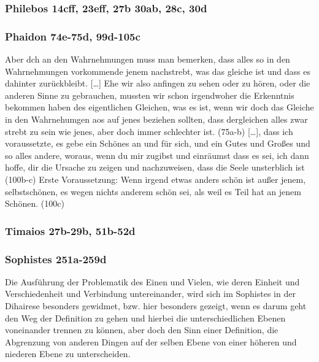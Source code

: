 \documentclass[12pt]{article}
\begin{document}
\subsubsection{Philebos 14cff, 23eff, 27b 30ab, 28c, 30d}

\subsubsection{Phaidon 74e-75d, 99d-105c}
Aber dch an den Wahrnehmungen muss man bemerken, dass alles so in den Wahrnehmungen vorkommende jenem nachstrebt, was das gleiche ist und dass es dahinter zurückbleibt. [\dots] Ehe wir also anfingen zu sehen oder zu hören, oder die anderen Sinne zu gebrauchen, mussten wir schon irgendwoher die Erkenntnis bekommen haben des eigentlichen Gleichen, was es ist, wenn wir doch das Gleiche in den Wahrnehumgen aos auf jenes beziehen sollten, dass dergleichen alles zwar strebt zu sein wie jenes, aber doch immer schlechter ist. (75a-b) 
[\dots], dass ich voraussetzte, es gebe ein Schönes an und für sich, und ein Gutes und Großes und so alles andere, woraus, wenn du mir zugibst und einräumst dass es sei, ich dann hoffe, dir die Ursache zu zeigen und nachzuweisen, dass die Seele unsterblich ist (100b-c)
Erste Voraussetzung: Wenn irgend etwas anders schön ist außer jenem, selbstschönen, es wegen nichts anderem schön sei, als weil es Teil hat an jenem Schönen. (100c)

\subsubsection{Timaios 27b-29b, 51b-52d}
\subsubsection{Sophistes 251a-259d}
Die Ausführung der Problematik des Einen und Vielen, wie deren Einheit und Verschiedenheit und Verbindung untereinander, wird sich im Sophistes in der Dihairese besonders gewidmet, bzw. hier besonders gezeigt, wenn es darum geht den Weg der Definition zu gehen und hierbei die unterschiedlichen Ebenen voneinander trennen zu können, aber doch den Sinn einer Definition, die Abgrenzung von anderen Dingen auf der selben Ebene von einer höheren und niederen Ebene zu unterscheiden.
\end{document}

